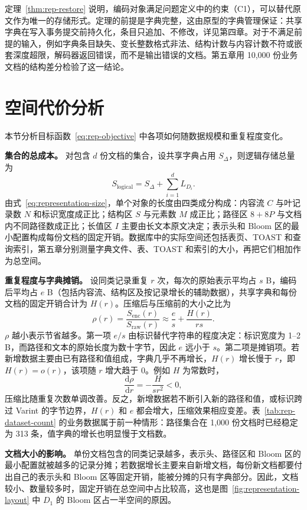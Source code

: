 定理~\ref{thm:rep-restore} 说明，编码对象满足问题定义中的约束（C1），可以替代原文作为唯一的存储形式。定理的前提是字典完整，这由原型的字典管理保证：共享字典在写入事务提交前持久化，条目只追加、不修改，详见第四章。对于不满足前提的输入，例如字典条目缺失、变长整数格式非法、结构计数与内容计数不符或嵌套深度超限，解码器返回错误，而不是输出错误的文档。第五章用 10,000 份业务文档的结构差分检验了这一结论。

\section{空间代价分析}
\label{sec:rep-space}

本节分析目标函数~\eqref{eq:rep-objective} 中各项如何随数据规模和重复程度变化。

\textbf{集合的总成本。} 对包含 $d$ 份文档的集合，设共享字典占用 $S_{\Delta}$，则逻辑存储总量为
\[
S_{\mathrm{logical}}=S_{\Delta}+\sum_{i=1}^{d}L_{D_i}.
\]
由式~\eqref{eq:representation-size}，单个对象的长度由四类成分构成：内容流 $C$ 与叶记录数 $N$ 和标识宽度成正比；结构区 $S$ 与元素数 $M$ 成正比；路径区 $8+8P$ 与文档内不同路径数成正比；长值区 $I$ 主要由长文本原文决定；表示头和 Bloom 区的最小配置构成每份文档的固定开销。数据库中的实际空间还包括表页、TOAST 和查询索引，第五章分别测量字典文件、表、TOAST 和索引的大小，再把它们相加作为总空间。

\textbf{重复程度与字典摊销。} 设同类记录重复 $r$ 次，每次的原始表示平均占 $s$ B，编码后平均占 $e$ B（包括内容流、结构区及按记录增长的辅助数据），共享字典和每份文档的固定开销合计为 $H(r)$。压缩后与压缩前的大小之比为
\[
\rho(r)=\frac{S_{\mathrm{enc}}(r)}{S_{\mathrm{raw}}(r)}
\approx\frac{e}{s}+\frac{H(r)}{rs}.
\]
$\rho$ 越小表示节省越多。第一项 $e/s$ 由标识替代字符串的程度决定：标识宽度为 1--2 B，而路径和文本的原始长度为数十字节，因此 $e$ 远小于 $s$。第二项是摊销项。若新增数据主要由已有路径和值组成，字典几乎不再增长，$H(r)$ 增长慢于 $r$，即 $H(r)=o(r)$，该项随 $r$ 增大趋于 0。例如 $H$ 为常数时，
\[
\frac{\mathrm{d}\rho}{\mathrm{d}r}=-\frac{H}{sr^2}<0,
\]
压缩比随重复次数单调改善。反之，新增数据若不断引入新的路径和值，或标识跨过 Varint 的字节边界，$H(r)$ 和 $e$ 都会增大，压缩效果相应变差。表~\ref{tab:rep-dataset-count} 的业务数据属于前一种情形：路径集合在 1,000 份文档时已经稳定为 313 条，值字典的增长也明显慢于文档数。

\textbf{文档大小的影响。} 单份文档包含的同类记录越多，表示头、路径区和 Bloom 区的最小配置就被越多的记录分摊；若数据增长主要来自新增文档，每份新文档都要付出自己的表示头和 Bloom 区等固定开销，能被分摊的只有字典部分。因此，文档较小、数量较多时，固定开销在总空间中占比较高，这也是图~\ref{fig:representation-layout} 中 $D_1$ 的 Bloom 区占一半空间的原因。

